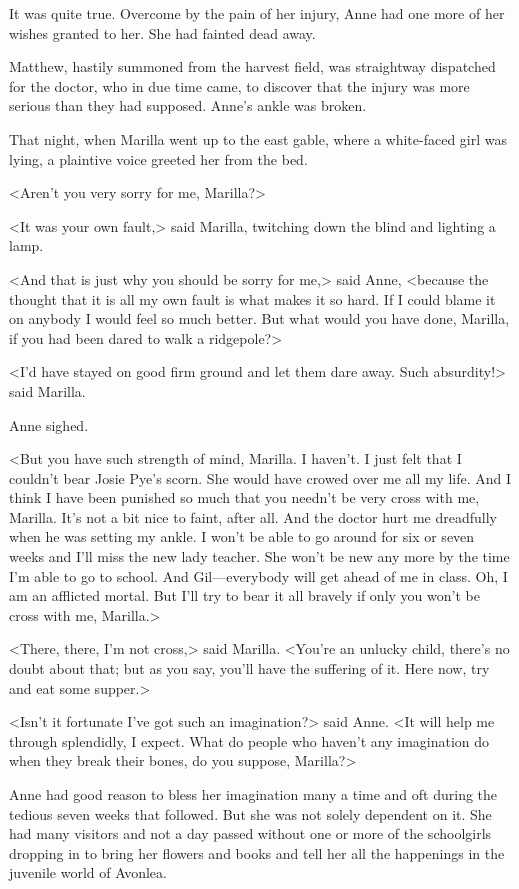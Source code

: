 It was quite true. Overcome by the pain of her injury, Anne had one more of her wishes granted to her. She had fainted dead away.

Matthew, hastily summoned from the harvest field, was straightway dispatched for the doctor, who in due time came, to discover that the injury was more serious than they had supposed. Anne's ankle was broken.

That night, when Marilla went up to the east gable, where a white-faced girl was lying, a plaintive voice greeted her from the bed.

<Aren't you very sorry for me, Marilla?>

<It was your own fault,> said Marilla, twitching down the blind and lighting a lamp.

<And that is just why you should be sorry for me,> said Anne, <because the thought that it is all my own fault is what makes it so hard. If I could blame it on anybody I would feel so much better. But what would you have done, Marilla, if you had been dared to walk a ridgepole?>

<I'd have stayed on good firm ground and let them dare away. Such absurdity!> said Marilla.

Anne sighed.

<But you have such strength of mind, Marilla. I haven't. I just felt that I couldn't bear Josie Pye's scorn. She would have crowed over me all my life. And I think I have been punished so much that you needn't be very cross with me, Marilla. It's not a bit nice to faint, after all. And the doctor hurt me dreadfully when he was setting my ankle. I won't be able to go around for six or seven weeks and I'll miss the new lady teacher. She won't be new any more by the time I'm able to go to school. And Gil—everybody will get ahead of me in class. Oh, I am an afflicted mortal. But I'll try to bear it all bravely if only you won't be cross with me, Marilla.>

<There, there, I'm not cross,> said Marilla. <You're an unlucky child, there's no doubt about that; but as you say, you'll have the suffering of it. Here now, try and eat some supper.>

<Isn't it fortunate I've got such an imagination?> said Anne. <It will help me through splendidly, I expect. What do people who haven't any imagination do when they break their bones, do you suppose, Marilla?>

Anne had good reason to bless her imagination many a time and oft during the tedious seven weeks that followed. But she was not solely dependent on it. She had many visitors and not a day passed without one or more of the schoolgirls dropping in to bring her flowers and books and tell her all the happenings in the juvenile world of Avonlea.

